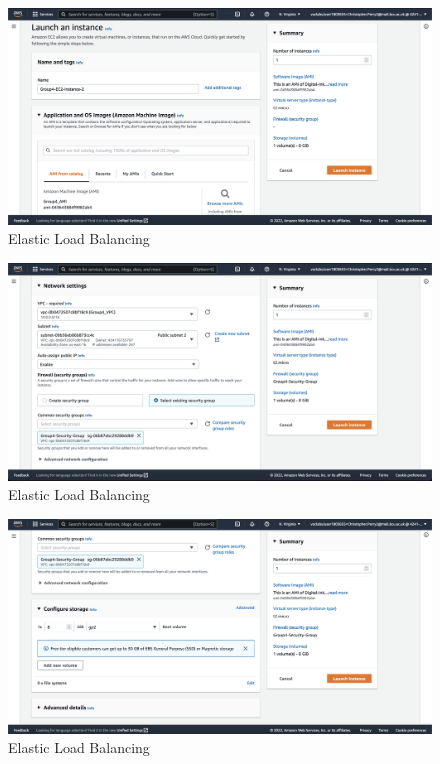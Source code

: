 \begin{figure}[!htbp]
    \centering
    \includegraphics[width=\textwidth]{resources/elb/elb-instance-2-name.png}
    \caption{Elastic Load Balancing}
    \label{fig:elb-instance-2-name}
\end{figure}
\begin{figure}[!htbp]
    \centering
    \includegraphics[width=\textwidth]{resources/elb/elb-instance-2-network-settings.png}
    \caption{Elastic Load Balancing}
    \label{fig:elb-instance-2-network-setting}
\end{figure}
\begin{figure}[!htbp]
    \centering
    \includegraphics[width=\textwidth]{resources/elb/elb-instance-2-storage-config.png}
    \caption{Elastic Load Balancing}
    \label{fig:elb-instance-2-storage}
\end{figure}
